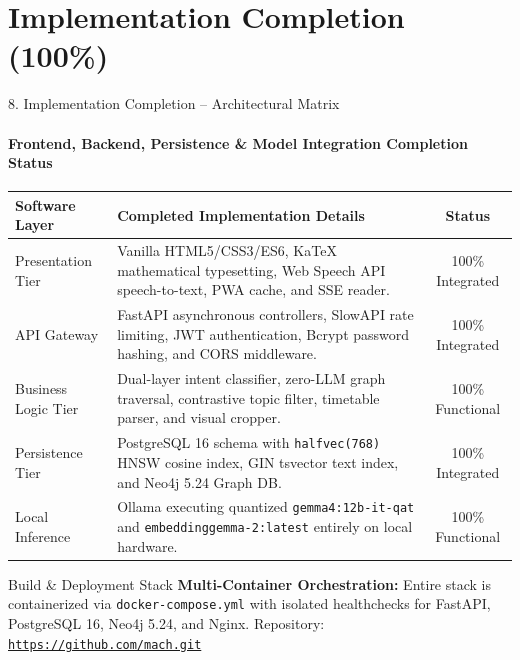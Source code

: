 \documentclass[aspectratio=169, 11pt]{beamer}
\begin{document}
\section{Implementation Completion (100\%)}

\begin{frame}{8. Implementation Completion -- Architectural Matrix}
    \framesubtitle{Frontend, Backend, Persistence \& Model Integration Completion Status}
    \begin{table}
        \centering
        \footnotesize
        \renewcommand{\arraystretch}{1.20}
        \begin{tabular}{p{3.2cm} p{6.8cm} c}
            \toprule
            \textbf{Software Layer} & \textbf{Completed Implementation Details} & \textbf{Status} \\
            \midrule
            Presentation Tier & Vanilla HTML5/CSS3/ES6, KaTeX mathematical typesetting, Web Speech API speech-to-text, PWA cache, and SSE reader. & 100\% Integrated \\
            API Gateway & FastAPI asynchronous controllers, SlowAPI rate limiting, JWT authentication, Bcrypt password hashing, and CORS middleware. & 100\% Integrated \\
            Business Logic Tier & Dual-layer intent classifier, zero-LLM graph traversal, contrastive topic filter, timetable parser, and visual cropper. & 100\% Functional \\
            Persistence Tier & PostgreSQL 16 schema with \texttt{halfvec(768)} HNSW cosine index, GIN tsvector text index, and Neo4j 5.24 Graph DB. & 100\% Integrated \\
            Local Inference & Ollama executing quantized \texttt{gemma4:12b-it-qat} and \texttt{embeddinggemma-2:latest} entirely on local hardware. & 100\% Functional \\
            \bottomrule
        \end{tabular}
    \end{table}

    \begin{block}{Build \& Deployment Stack}
        \scriptsize
        \textbf{Multi-Container Orchestration:} Entire stack is containerized via \texttt{docker-compose.yml} with isolated healthchecks for FastAPI, PostgreSQL 16, Neo4j 5.24, and Nginx. Repository: \href{https://github.com/saicharan45264/Campus-Knowledge-Engine.git}{\texttt{https://github.com/mach.git}}
    \end{block}
\end{frame}
\end{document}
